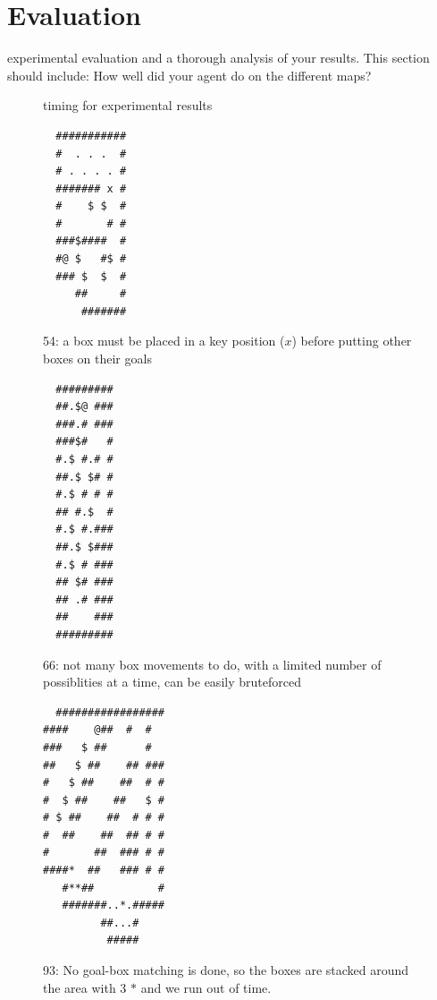 \documentclass[a4paper,11pt]{article}
\begin{document}
\section{Evaluation}
experimental evaluation and a thorough analysis of your results. This section should include:
How well did your agent do on the different maps?
\begin{figure}
  \centering

  \caption{timing for experimental results}
  \label{fig:exptime}
\end{figure}

\begin{figure}
  \begin{verbatim}
  ###########
  #  . . .  #
  # . . . . #
  ####### x #
  #    $ $  #
  #       # #
  ###$####  #
  #@ $   #$ #
  ### $  $  #
     ##     #
      #######
  \end{verbatim}
  \caption{54: a box must be placed in a key position ($x$) before putting other boxes on their goals}
\end{figure}
\begin{figure}
  \begin{verbatim}
  #########
  ##.$@ ###
  ###.# ###
  ###$#   #
  #.$ #.# #
  ##.$ $# #
  #.$ # # #
  ## #.$  #
  #.$ #.###
  ##.$ $###
  #.$ # ###
  ## $# ###
  ## .# ###
  ##    ###
  #########

  \end{verbatim}
  \caption{66: not many box movements to do, with a limited number of possiblities at a time, can be easily bruteforced}
\end{figure}
\begin{figure}
  \begin{verbatim}
  #################  
####    @##  #  #  
###   $ ##      #  
##   $ ##    ## ###
#   $ ##    ##  # #
#  $ ##    ##   $ #
# $ ##    ##  # # #
#  ##    ##  ## # #
#       ##  ### # #
####*  ##   ### # #
   #**##          #
   #######..*.#####
         ##...#    
          #####
  \end{verbatim}
  \caption{93: No goal-box matching is done, so the boxes are stacked around the area with 3 $*$ and we run out of time.}
\end{figure}
\end{document}
